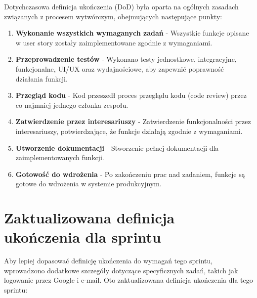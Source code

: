 \documentclass[12pt,a4paper,colorlinks=true,linkcolor=NavyBlue,citecolor=red,urlcolor=NavyBlue]{book}
\begin{document}
Dotychczasowa definicja ukończenia (DoD) była oparta na ogólnych zasadach związanych z procesem wytwórczym, obejmujących następujące punkty:

\begin{enumerate}[topsep=0pt, itemsep=0.3em]
    \item \textbf{Wykonanie wszystkich wymaganych zadań} - Wszystkie funkcje opisane w user story zostały zaimplementowane zgodnie z wymaganiami.
    \item \textbf{Przeprowadzenie testów} - Wykonano testy jednostkowe, integracyjne, funkcjonalne, UI/UX oraz wydajnościowe, aby zapewnić poprawność działania funkcji.
    \item \textbf{Przegląd kodu} - Kod przeszedł proces przeglądu kodu (code review) przez co najmniej jednego członka zespołu.
    \item \textbf{Zatwierdzenie przez interesariuszy} - Zatwierdzenie funkcjonalności przez interesariuszy, potwierdzające, że funkcje działają zgodnie z wymaganiami.
    \item \textbf{Utworzenie dokumentacji} - Stworzenie pełnej dokumentacji dla zaimplementowanych funkcji.
    \item \textbf{Gotowość do wdrożenia} - Po zakończeniu prac nad zadaniem, funkcje są gotowe do wdrożenia w systemie produkcyjnym.
\end{enumerate}

\section{Zaktualizowana definicja ukończenia dla sprintu}

Aby lepiej dopasować definicję ukończenia do wymagań tego sprintu, wprowadzono dodatkowe szczegóły dotyczące specyficznych zadań, takich jak logowanie przez Google i e-mail. Oto zaktualizowana definicja ukończenia dla tego sprintu:
\end{document}
